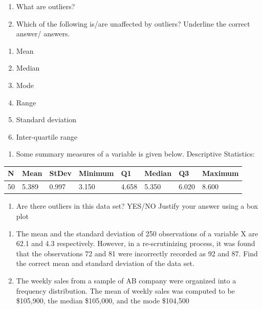 \documentclass[]{book}
\providecommand{\tightlist}{%
  \setlength{\itemsep}{0pt}\setlength{\parskip}{0pt}}
\begin{document}
\begin{enumerate}
\def\labelenumi{(\alph{enumi})}
\tightlist
\item
  What are outliers?
\item
  Which of the following is/are unaffected by outliers? Underline the correct answer/ answers.
\end{enumerate}

\begin{enumerate}
\def\labelenumi{\alph{enumi}.}
\tightlist
\item
  Mean
\item
  Median
\item
  Mode
\item
  Range
\item
  Standard deviation
\item
  Inter-quartile range
\end{enumerate}

\begin{enumerate}
\def\labelenumi{(\alph{enumi})}
\setcounter{enumi}{2}
\tightlist
\item
  Some summary measures of a variable is given below.
  Descriptive Statistics:
\end{enumerate}

\begin{longtable}[]{@{}llllllll@{}}
\toprule
N & Mean & StDev & Minimum & Q1 & Median & Q3 & Maximum\tabularnewline
\midrule
\endhead
50 & 5.389 & 0.997 & 3.150 & 4.658 & 5.350 & 6.020 & 8.600\tabularnewline
\bottomrule
\end{longtable}

\begin{enumerate}
\def\labelenumi{(\alph{enumi})}
\setcounter{enumi}{3}
\tightlist
\item
  Are there outliers in this data set? YES/NO
  Justify your answer using a box plot
\end{enumerate}

\begin{enumerate}
\def\labelenumi{\arabic{enumi}.}
\setcounter{enumi}{12}
\item
  The mean and the standard deviation of 250 observations of a variable X are 62.1 and 4.3 respectively. However, in a re-scrutinizing process, it was found that the observations 72 and 81 were incorrectly recorded as 92 and 87. Find the correct mean and standard deviation of the data set.
\item
  The weekly sales from a sample of AB company were organized into a frequency distribution. The mean of weekly sales was computed to be \$105,900, the median \$105,000, and the mode \$104,500
\end{enumerate}
\end{document}
